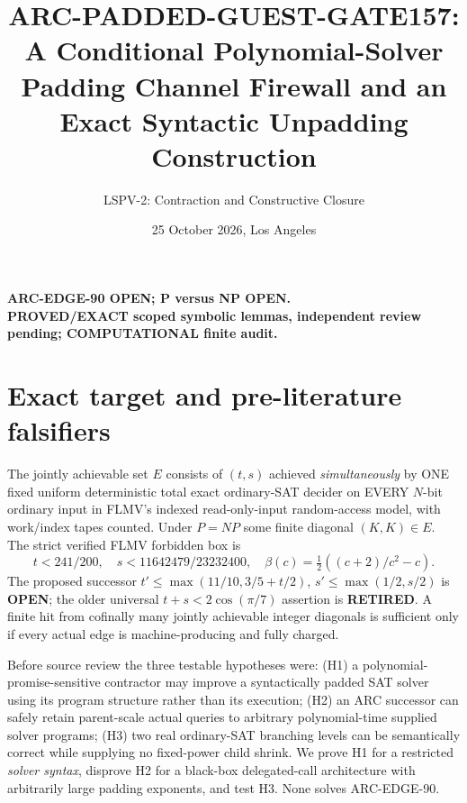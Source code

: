 \documentclass[11pt]{article}
\title{ARC-PADDED-GUEST-GATE157: A Conditional Polynomial-Solver Padding Channel Firewall and an Exact Syntactic Unpadding Construction}
\author{LSPV-2: Contraction and Constructive Closure}
\date{25 October 2026, Los Angeles}
\begin{document}
\maketitle
\begin{center}\textbf{ARC-EDGE-90 OPEN; P versus NP OPEN.}\\
\textbf{PROVED/EXACT scoped symbolic lemmas, independent review pending; COMPUTATIONAL finite audit.}\end{center}

\section*{Exact target and pre-literature falsifiers}
The jointly achievable set \(E\) consists of \((t,s)\) achieved \emph{simultaneously} by ONE fixed uniform deterministic total exact ordinary-SAT decider on EVERY \(N\)-bit ordinary input in FLMV's indexed read-only-input random-access model, with work/index tapes counted. Under \(P=NP\) some finite diagonal \((K,K)\in E\). The strict verified FLMV forbidden box is
\[
 t<241/200,\quad s<11642479/23232400,\quad
 \beta(c)=\tfrac12((c+2)/c^2-c).
\]
The proposed successor \(t'\le\max(11/10,3/5+t/2)\), \(s'\le\max(1/2,s/2)\) is \textbf{OPEN}; the older universal \(t+s<2\cos(\pi/7)\) assertion is \textbf{RETIRED}. A finite hit from cofinally many jointly achievable integer diagonals is sufficient only if every actual edge is machine-producing and fully charged.

Before source review the three testable hypotheses were: (H1) a polynomial-promise-sensitive contractor may improve a syntactically padded SAT solver using its program structure rather than its execution; (H2) an ARC successor can safely retain parent-scale actual queries to arbitrary polynomial-time supplied solver programs; (H3) two real ordinary-SAT branching levels can be semantically correct while supplying no fixed-power child shrink. We prove H1 for a restricted \emph{solver syntax}, disprove H2 for a black-box delegated-call architecture with arbitrarily large padding exponents, and test H3. None solves ARC-EDGE-90.
\end{document}
